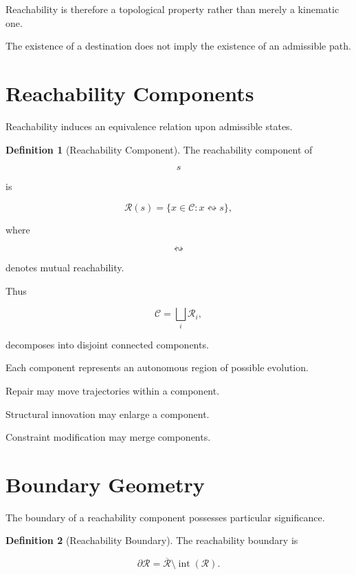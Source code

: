 \documentclass[11pt,oneside]{book}
\numberwithin{equation}{chapter}
\theoremstyle{definition}
\newtheorem{definition}{Definition}[chapter]
\theoremstyle{plain}
\begin{document}
Reachability is therefore a topological property rather than merely a
kinematic one.

The existence of a destination does not imply the existence of an admissible
path.

\section{Reachability Components}

Reachability induces an equivalence relation upon admissible states.

\begin{definition}[Reachability Component]

The reachability component of

\[
s
\]

is

\[
\mathcal{R}(s)
=
\{
x\in\mathcal{C}
:
x
\leftrightsquigarrow
s
\},
\]

where

\[
\leftrightsquigarrow
\]

denotes mutual reachability.

\end{definition}

Thus

\[
\mathcal{C}
=
\bigsqcup_i
\mathcal{R}_i,
\]

decomposes into disjoint connected components.

Each component represents an autonomous region of possible evolution.

Repair may move trajectories within a component.

Structural innovation may enlarge a component.

Constraint modification may merge components.

\section{Boundary Geometry}

The boundary of a reachability component possesses particular significance.

\begin{definition}[Reachability Boundary]

The reachability boundary is

\[
\partial\mathcal{R}
=
\overline{\mathcal{R}}
\setminus
\operatorname{int}(\mathcal{R}).
\]

\end{definition}
\end{document}
